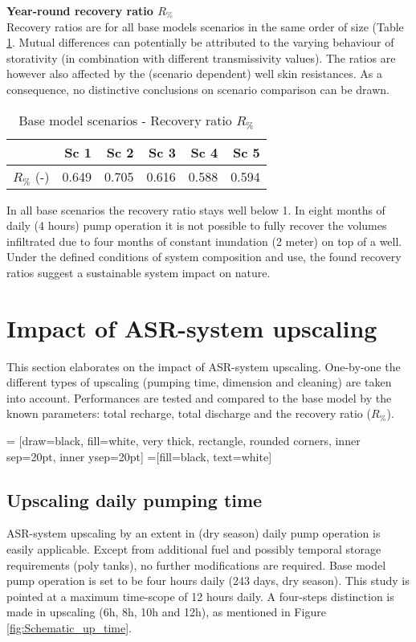 \textbf{Year-round recovery ratio $R_\%$} \\
Recovery ratios are for all base models scenarios in the same order of size (Table \ref{tab:Base_RR}. Mutual differences can potentially be attributed to the varying behaviour of storativity (in combination with different transmissivity values). The ratios are however also affected by the (scenario dependent) well skin resistances. As a consequence, no distinctive conclusions on scenario comparison can be drawn. \\ 

\begin{table}[h!]
\small
\centering
\caption{Base model scenarios - Recovery ratio $R_\%$}
\label{tab:Base_RR}
\begin{tabular}{l|r|r|r|r|r}
\hline 
\textbf{}               & \textbf{Sc 1} & \textbf{Sc 2} & \textbf{Sc 3} & \textbf{Sc 4}  & \textbf{Sc 5} \\ \hline \hline
$R_\%$ (-)              &  0.649        & 0.705         & 0.616         & 0.588 	     & 0.594 	          \\ \hline    
\end{tabular}
\end{table}

In all base scenarios the recovery ratio stays well below 1. In eight months of daily (4 hours) pump operation it is not possible to fully recover the volumes infiltrated due to four months of constant inundation (2 meter) on top of a well. Under the defined conditions of system composition and use, the found recovery ratios suggest a sustainable system impact on nature. 

\section{Impact of ASR-system upscaling}
\label{section:ASR_upscaling}
This section elaborates on the impact of ASR-system upscaling. One-by-one the different types of upscaling (pumping time, dimension and cleaning) are taken into account. Performances are tested and compared to the base model by the known parameters: total recharge, total discharge and the recovery ratio ($R_{\%}$).  

 = [draw=black, fill=white, very thick,
    rectangle, rounded corners, inner sep=20pt, inner ysep=20pt]
 =[fill=black, text=white]

\subsection{Upscaling daily pumping time}
\label{Subsec:Up_time}
ASR-system upscaling by an extent in (dry season) daily pump operation is easily applicable. Except from additional fuel and possibly temporal storage requirements (poly tanks), no further modifications are required. Base model pump operation is set to be four hours daily (243 days, dry season). This study is pointed at a maximum time-scope of 12 hours daily. A four-steps distinction is made in upscaling (6h, 8h, 10h and 12h), as mentioned in Figure \ref{fig:Schematic_up_time}. 

